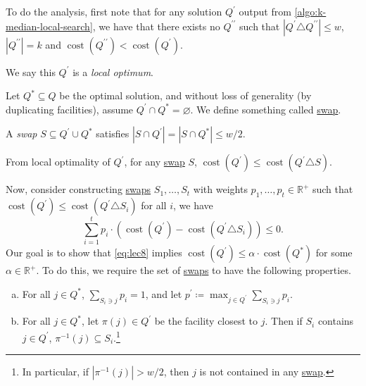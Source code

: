 To do the analysis, first note that for any solution \(Q^\prime \) output from \autoref{algo:k-median-local-search}, we have that there exists no \(Q^{\prime\prime}\) such that \(\left\vert Q^\prime \triangle Q^{\prime\prime} \right\vert \leq w\), \(\left\vert Q^{\prime\prime} \right\vert = k\) and \(\mathop{\mathrm{cost}}(Q^{\prime\prime}) < \mathop{\mathrm{cost}}(Q^\prime )\).

\begin{note}
	We say this \(Q^\prime \) is a \emph{local optimum}.
\end{note}

Let \(Q^{\ast} \subseteq Q\) be the optimal solution, and without loss of generality (by duplicating facilities), assume \(Q^\prime \cap Q^{\ast} = \varnothing \). We define something called \hyperref[not:swap]{swap}.

\begin{notation}[Swap]\label{not:swap}
	A \emph{swap} \(S \subseteq Q^\prime \cup Q^{\ast} \) satisfies \(\left\vert S \cap Q^\prime  \right\vert = \left\vert S \cap Q^{\ast}  \right\vert \leq w / 2\).
\end{notation}

\begin{note}
	From local optimality of \(Q^\prime \), for any \hyperref[not:swap]{swap} \(S\), \(\mathop{\mathrm{cost}}(Q^\prime ) \leq \mathop{\mathrm{cost}}(Q^\prime \triangle S)\).
\end{note}

Now, consider constructing \hyperref[not:swap]{swaps} \(S_1, \ldots, S_t\) with weights \(p_1, \ldots , p_t \in \mathbb{R} ^+\) such that \(\mathop{\mathrm{cost}}(Q^\prime ) \leq \mathop{\mathrm{cost}}(Q^\prime \triangle S_i)\) for all \(i\), we have
\begin{equation}\label{eq:lec8}
	\sum_{i=1} ^t p_i \cdot (\mathop{\mathrm{cost}}(Q^\prime ) - \mathop{\mathrm{cost}}(Q^\prime \triangle S_i)) \leq 0.
\end{equation}
Our goal is to show that \autoref{eq:lec8} implies \(\mathop{\mathrm{cost}}(Q^\prime ) \leq \alpha\cdot \mathop{\mathrm{cost}}(Q^{\ast} )\) for some \(\alpha \in \mathbb{R} ^+\). To do this, we require the set of \hyperref[not:swap]{swaps} to have the following properties.

\begin{enumerate}[(a)]
	\item For all \(j\in Q^{\ast} \), \(\sum_{S_i \ni j}p_i = 1 \), and let \(p^\prime \coloneqq \max _{j\in Q^\prime }\sum_{S_i\ni j}p_i\).
	\item For all \(j\in Q^{\ast} \), let \(\pi (j)\in Q^\prime \) be the facility closest to \(j\). Then if \(S_i\) contains \(j\in Q^\prime \), \(\pi ^{-1} (j)\subseteq S_i\).\footnote{In particular, if \(\left\vert \pi ^{-1} (j) \right\vert > w / 2 \), then \(j\) is not contained in any \hyperref[not:swap]{swap}.}
\end{enumerate}

